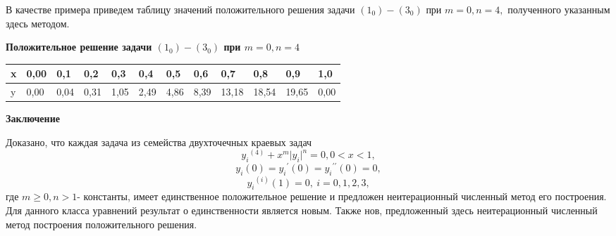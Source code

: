        В качестве примера приведем таблицу значений положительного решения задачи
$ (1_0)-(3_0) $ при $ m=0,n=4,$ полученного указанным здесь методом.
\vspace {0.5 cm}


\centerline {\bf Положительное решение задачи
$ (1_0)-(3_0) $ при $ m=0,n=4 $}
\quad \begin{tabular}[c]{|l|l|l|l|l|l|l|l|l|l|l|l|}
\hline
x& 0,00 &0,1  & 0,2 & 0,3 & 0,4 & 0,5 & 0,6 & 0,7 & 0,8 & 0,9 & 1,0 \\
\hline
y& 0,00 & 0,04 & 0,31 & 1,05 & 2,49 & 4,86 &  8,39  & 13,18
& 18,54 & 19,65 & 0,00 \\
\hline
\end{tabular}
\bigskip



\centerline { \bf Заключение }

Доказано, что каждая задача из семейства двухточечных краевых задач
$$
{y_{i}}^{(4)}+x^m{\vert y_{i}\vert}^n=0, 0<x<1,
 $$
$$
y_{i}(0)={y_{i}}^{\prime}(0)={y_{i}}^{\prime\prime}(0)=0,
$$
$$
{y_{i}}^{(i)}(1)=0,\ i=0,1,2,3,
$$
где $m\geq 0, n>1$- константы, имеет единственное положительное решение и предложен
неитерационный численный метод его построения. Для данного класса уравнений результат
о единственности является новым. Также нов, предложенный здесь неитерационный
численный метод построения положительного решения.

